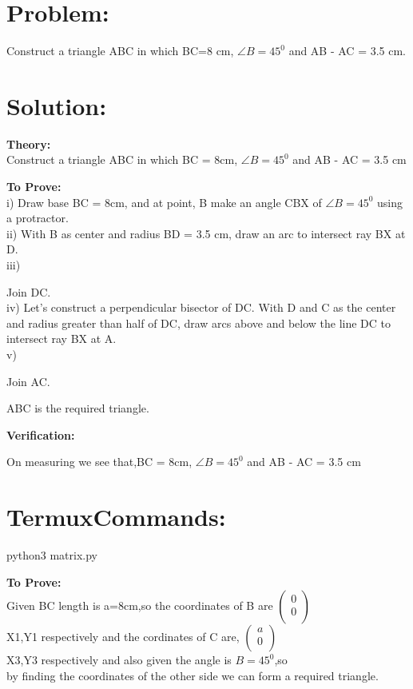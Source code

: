 \documentclass[10pt,a4paper]{report}
\begin{document}
\begin{multicols}{2}

\section{Problem:}  Construct a triangle ABC in which BC=8 cm, $\angle{B}=45^0$ and AB - AC = 3.5 cm.\vspace{3mm}
 \section{Solution: }
\raggedright \textbf{Theory:}\\
\centering Construct a triangle ABC in which BC = 8cm, $\angle{B}=45^0$ and AB - AC = 3.5 cm \\

\raggedright \textbf{To Prove:}\\
i) Draw base BC = 8cm, and at point, B make an angle CBX of $\angle{B}=45^0$ using \centering a protractor. \\ 
ii) With B as center and radius BD = 3.5 cm, draw an arc to intersect ray BX at D. \\
iii) \raggedright Join DC. \\
iv) Let's construct a perpendicular bisector of DC. With D and C as the center \centering and radius greater than half of DC, draw arcs above and below the line DC to intersect ray BX at A. \\
v) \raggedright Join AC. 

\centering ABC is the required triangle. 

\raggedright\textbf{Verification:} 

On measuring we see that,BC = 8cm, $\angle{B}=45^0$ and  AB - AC = 3.5 cm  \\
   \section{TermuxCommands: } 
               \centering python3 matrix.py

\raggedright \textbf{To Prove:}\\
   Given BC length is a=8cm,so the coordinates of B are 
 $\begin{pmatrix}
  0\\
  0 \\
 \end{pmatrix}$%
 \\ X1,Y1 respectively and the cordinates of C are,
 $\begin{pmatrix}
  a\\
  0 \\
 \end{pmatrix}$%
 \\ X3,Y3 respectively and also given the angle is $B=45^0$,so \\ by finding the coordinates of the other side we can form a required triangle. \\


\end{multicols}
\end{document}

